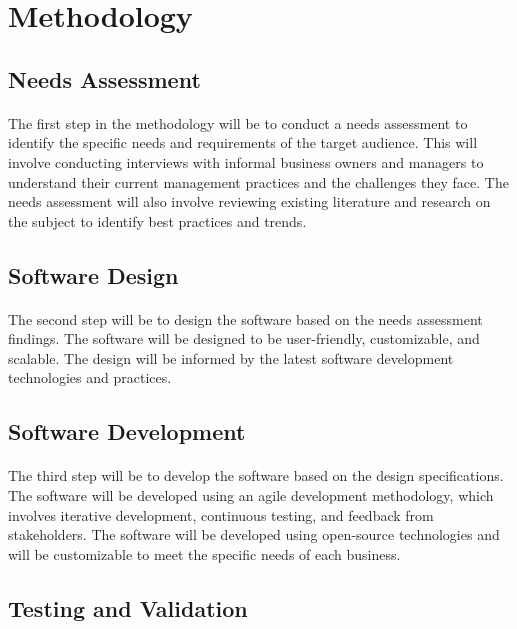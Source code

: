 \documentclass{article}
\begin{document}
\newpage

\section*{Methodology}
\subsection*{Needs Assessment}
\paragraph*{}
The first step in the methodology will be to conduct a needs assessment to identify the specific needs and requirements of the target audience. This will involve conducting interviews with informal business owners and managers to understand their current management practices and the challenges they face. The needs assessment will also involve reviewing existing literature and research on the subject to identify best practices and trends.

\subsection*{Software Design}
\paragraph*{}
The second step will be to design the software based on the needs assessment findings. The software will be designed to be user-friendly, customizable, and scalable. The design will be informed by the latest software development technologies and practices.

\subsection*{Software Development}
\paragraph*{}
The third step will be to develop the software based on the design specifications. The software will be developed using an agile development methodology, which involves iterative development, continuous testing, and feedback from stakeholders. The software will be developed using open-source technologies and will be customizable to meet the specific needs of each business.

\subsection*{Testing and Validation}
\end{document}
